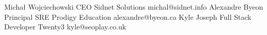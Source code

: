 \documentclass[localFont,alternative,10pt]{yaac-another-awesome-cv}
\begin{document}
  \vspace{0.5em}

  \begin{referees}
      {Michał Wojciechowski}
      {CEO}
      {Sidnet Solutions}
      {michal@sidnet.info}
      {Alexandre Byeon}
      {Principal SRE}
      {Prodigy Education}
      {alexandre@byeon.ca}
      {Kyle Joseph}
      {Full Stack Developer}
      {Twenty3}
      {kyle@seoplay.co.uk}
  \end{referees}
\end{document}
